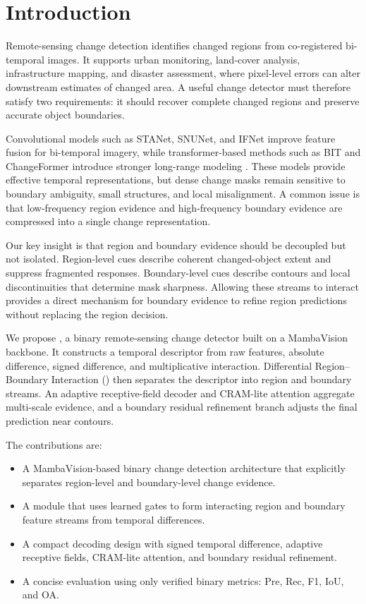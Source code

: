 \section{Introduction}

Remote-sensing change detection identifies changed regions from co-registered bi-temporal images. It supports urban monitoring, land-cover analysis, infrastructure mapping, and disaster assessment, where pixel-level errors can alter downstream estimates of changed area. A useful change detector must therefore satisfy two requirements: it should recover complete changed regions and preserve accurate object boundaries.

Convolutional models such as STANet, SNUNet, and IFNet improve feature fusion for bi-temporal imagery, while transformer-based methods such as BIT and ChangeFormer introduce stronger long-range modeling \cite{STANet,SNUNet,IFNet,BIT,ChangeFormer}. These models provide effective temporal representations, but dense change masks remain sensitive to boundary ambiguity, small structures, and local misalignment. A common issue is that low-frequency region evidence and high-frequency boundary evidence are compressed into a single change representation.

Our key insight is that region and boundary evidence should be decoupled but not isolated. Region-level cues describe coherent changed-object extent and suppress fragmented responses. Boundary-level cues describe contours and local discontinuities that determine mask sharpness. Allowing these streams to interact provides a direct mechanism for boundary evidence to refine region predictions without replacing the region decision.

We propose \ours, a binary remote-sensing change detector built on a MambaVision backbone. It constructs a temporal descriptor from raw features, absolute difference, signed difference, and multiplicative interaction. Differential Region--Boundary Interaction (\drbi) then separates the descriptor into region and boundary streams. An adaptive receptive-field decoder and CRAM-lite attention aggregate multi-scale evidence, and a boundary residual refinement branch adjusts the final prediction near contours.

The contributions are:
\begin{itemize}
    \item A MambaVision-based binary change detection architecture that explicitly separates region-level and boundary-level change evidence.
    \item A \drbi{} module that uses learned gates to form interacting region and boundary feature streams from temporal differences.
    \item A compact decoding design with signed temporal difference, adaptive receptive fields, CRAM-lite attention, and boundary residual refinement.
    \item A concise evaluation using only verified binary metrics: Pre, Rec, F1, IoU, and OA.
\end{itemize}
